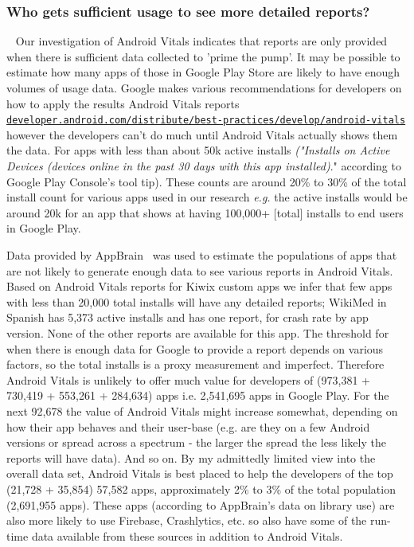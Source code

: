 \subsubsection{Who gets sufficient usage to see more detailed reports?}~\label{tata-sufficient-usage-to-see-more-detailed-reports-topic}
Our investigation of Android Vitals indicates that reports are only provided when there is sufficient data collected to 'prime the pump'. It may be possible to estimate how many apps of those in Google Play Store are likely to have enough volumes of usage data. Google makes various recommendations for developers on how to apply the results Android Vitals reports \href{https://developer.android.com/distribute/best-practices/develop/android-vitals}{\nolinkurl{developer.android.com/distribute/best-practices/develop/android-vitals}} however the developers can't do much until Android Vitals actually shows them the data. For apps with less than about 50k active installs \emph{("Installs on Active Devices (devices online in the past 30 days with this app installed)}." according to Google Play Console's tool tip). These counts are around 20\% to 30\% of the total install count for various apps used in our research \emph{e.g.} the active installs would be around 20k for an app that shows at having 100,000+ [total] installs to end users in Google Play.

Data provided by AppBrain~\cite{appbrain_download_statistics_june_2019} was used to estimate the populations of apps that are not likely to generate enough data to see various reports in Android Vitals.
% 
Based on Android Vitals reports for Kiwix custom apps we infer that few apps with less than 20,000 total installs will have any detailed reports; WikiMed in Spanish has 5,373 active installs and has one report, for crash rate by app version. None of the other reports are available for this app. The threshold for when there is enough data for Google to provide a report depends on various factors, so the total installs is a proxy measurement and imperfect. Therefore Android Vitals is unlikely to offer much value for developers of (973,381 + 730,419 + 553,261 + 284,634) apps i.e. 2,541,695 apps in Google Play. For the next 92,678 the value of Android Vitals might increase somewhat, depending on how their app behaves and their user-base (e.g. are they on a few Android versions or spread across a spectrum - the larger the spread the less likely the reports will have data). And so on. By my admittedly limited view into the overall data set, Android Vitals is best placed to help the developers of the top (21,728 + 35,854) 57,582 apps, approximately 2\% to 3\% of the total population (2,691,955 apps). These apps (according to AppBrain's data on library use) are also more likely to use Firebase, Crashlytics, etc. so also have some of the run-time data available from these sources in addition to Android Vitals.

